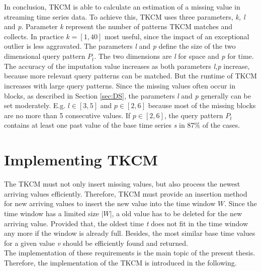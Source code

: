 \documentclass[abstracton,12pt]{scrreprt}
\begin{document}
In conclusion, TKCM is able to calculate an estimation of a missing value in streaming time series data. To achieve this, TKCM uses three parameters, \emph{k, l} and \emph{p}. Parameter \emph{k} represent the number of patterns TKCM matches and collects. In practice $k =[1,40]$ most useful, since the impact of an exceptional outlier is less aggravated. The parameters \emph{l} and \emph{p} define the size of the two dimensional query pattern $P_{\bar{t}}$. The two dimensions are \emph{l} for space and \emph{p} for time. The accuracy of the imputation value increases as both parameters \emph{l,p} increase, because more relevant query patterns can be matched. But the runtime of TKCM increases with large query patterns. Since the missing values often occur in blocks, as described in Section \ref{sec:DS}, the parameters \emph{l} and \emph{p} generally can be set moderately. E.g. 
$l \in [3,5]$ and $p \in [2,6]$ because most of the missing blocks are no more than 5 consecutive values. If 
$p \in [2,6]$, the query pattern $P_{\bar{t}}$ contains at least one past value of the base time series \emph{s} in 87\% of the cases.


\section{Implementing TKCM}
\label{sec:ImpTKCM}
The TKCM must not only insert missing values, but also process the newest arriving values efficiently. Therefore, TKCM must provide an insertion method for new arriving values to insert the new value into the time window $W$. Since the time window has a limited size $|W|$, a old value has to be deleted for the new arriving value. Provided that, the oldest time \emph{t} does not fit in the time window any more if the window is already full. Besides, the most similar base time values for a given value \emph{v} should be efficiently found and returned. \\
The implementation of these requirements is the main topic of the present thesis. Therefore, the implementation of the TKCM is introduced in the following.
\end{document}
